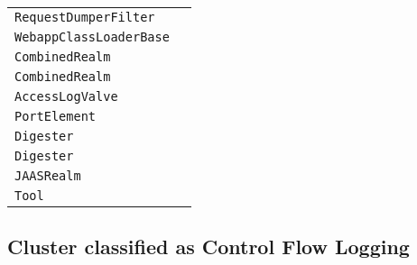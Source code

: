 \begin{center}
\begin{tabular}{ll}
\lstinline/RequestDumperFilter/&\raisebox{0pt}{\lstinline/doLog(String,String)/}\\ 
\lstinline/WebappClassLoaderBase/&\raisebox{0pt}{\lstinline/findClassInternal(String)/}\\ 
\lstinline/CombinedRealm/&\raisebox{0pt}{\lstinline/getPrincipal(String)/}\\ 
\lstinline/CombinedRealm/&\raisebox{0pt}{\lstinline/getPrincipal(String)/}\\ 
\lstinline/AccessLogValve/&\raisebox{0pt}{\lstinline/getServletRequestElement(String)/}\\ 
\lstinline/PortElement/&\raisebox{0pt}{\lstinline/PortElement(String)/}\\ 
\lstinline/Digester/&\raisebox{0pt}{\lstinline/createSAXException(String,Exception)/}\\ 
\lstinline/Digester/&\raisebox{0pt}{\lstinline/createSAXException(String,Exception)/}\\ 
\lstinline/JAASRealm/&\raisebox{0pt}{\lstinline/authenticate(String,CallbackHandler)/}\\ 
\lstinline/Tool/&\raisebox{0pt}{\lstinline/usage()/}\\ 
\bottomrule
\end{tabular}
\end{center}

\subsection{Cluster classified as Control Flow Logging}

